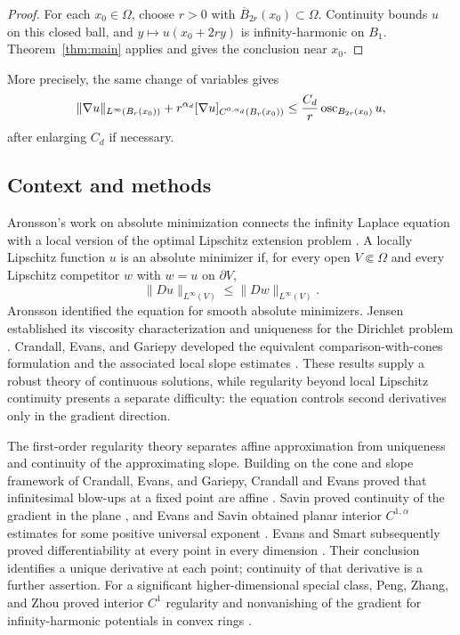 \begin{proof}
For each $x_0\in\Omega$, choose $r>0$ with
$\overline B_{2r}(x_0)\subset\Omega$. Continuity bounds $u$ on this closed
ball, and $y\mapsto u(x_0+2ry)$ is infinity-harmonic on $B_1$.
Theorem~\ref{thm:main} applies and gives the conclusion near $x_0$.
\end{proof}

More precisely, the same change of variables gives
\[
 \|\nabla u\|_{L^\infty(B_r(x_0))}
   +r^{\alpha_d}[\nabla u]_{C^{0,\alpha_d}(B_r(x_0))}
   \le \frac{C_d}{r}\operatorname{osc}_{B_{2r}(x_0)}u,
\]
after enlarging $C_d$ if necessary.

\subsection{Context and methods}
Aronsson's work on absolute minimization connects the infinity Laplace
equation with a local version of the optimal Lipschitz extension problem
\cite{Aronsson1967}. A locally Lipschitz function $u$ is an absolute
minimizer if, for every open $V\Subset\Omega$ and every Lipschitz
competitor $w$ with $w=u$ on $\partial V$,
\[
  \|Du\|_{L^\infty(V)}\le\|Dw\|_{L^\infty(V)}.
\]
Aronsson identified the equation for smooth absolute minimizers.
Jensen established its viscosity characterization and uniqueness for the
Dirichlet problem \cite{Jensen1993}. Crandall, Evans, and Gariepy
developed the equivalent comparison-with-cones formulation and the
associated local slope estimates \cite{CrandallEvansGariepy2001}.
These results supply a robust theory of continuous solutions, while
regularity beyond local Lipschitz continuity presents a separate
difficulty: the equation controls second derivatives only in the gradient
direction.

The first-order regularity theory separates affine approximation from
uniqueness and continuity of the approximating slope. Building on the
cone and slope framework of Crandall, Evans, and Gariepy,
Crandall and Evans proved that infinitesimal blow-ups at a fixed point
are affine \cite{CrandallEvansGariepy2001,CrandallEvans2001}.
Savin proved continuity of the gradient in the plane
\cite{Savin2005}, and Evans and Savin obtained planar interior
$C^{1,\alpha}$ estimates for some positive universal exponent
\cite{EvansSavin2008}. Evans and Smart subsequently proved
differentiability at every point in every dimension
\cite{EvansSmart2011}. Their conclusion identifies a unique derivative
at each point; continuity of that derivative is a further assertion.
For a significant higher-dimensional special class, Peng, Zhang, and
Zhou proved interior $C^1$ regularity and nonvanishing of the gradient for
infinity-harmonic potentials in convex rings
\cite{PengZhangZhou2025}.

